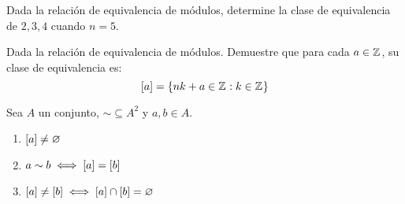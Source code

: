 \begin{frame}
	
\end{frame}
\begin{frame}
	\begin{exercise}
		Dada la relación de equivalencia de módulos, determine la clase de equivalencia de $ 2, 3, 4 $ cuando $ n = 5 $.
	\end{exercise}
\end{frame}
\begin{frame}
	
\end{frame}
\begin{frame}
	\begin{exercise}
		Dada la relación de equivalencia de módulos. Demuestre que para cada $ a\in\mathbb{Z}^{} $, su clase de equivalencia es:
		\[ \left[ a \right] =\left\{ nk + a\in\mathbb{Z}^{}: k\in\mathbb{Z}^{} \right\} \]
	\end{exercise}
\end{frame}
\begin{frame}
	\begin{mtheorem}
		Sea $ A $ un conjunto, $ \sim\subseteq A^{2} $ y $ a, b\in A $.
		\begin{enumerate}
			\item $ \left[ a \right]\neq\varnothing $
			\item $ a\sim b\iff\left[ a \right] =\left[ b \right] $
			\item $ \left[ a \right]\neq\left[ b \right]\iff\left[ a \right]\cap\left[ b \right] =\varnothing $
		\end{enumerate}
	\end{mtheorem}
\end{frame}
